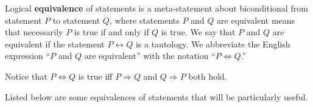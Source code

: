 \documentclass[a4paper,english,12pt]{article}
\begin{document}
\begin{defn}[Equivalence] Logical \textbf{equivalence} of statements is a meta-statement about biconditional from statement $P$ to statement $Q$, where statements $P$ and $Q$ are equivalent means that necessarily $P$ is true if and only if $Q$ is true. We say that $P$ and $Q$ are equivalent if the statement $P\leftrightarrow Q$ is a tautology. We abbreviate the English expression ``$P$ and $Q$ are equivalent'' with the notation ``$P\Leftrightarrow Q$.'' 
\end{defn} 
\begin{rem} Notice that $P \Leftrightarrow Q$ is true iff $P \Rightarrow Q$ and $Q \Rightarrow P$ both hold.
\end{rem}
Listed below are some equivalences of statements that will be particularly useful.
\end{document}

